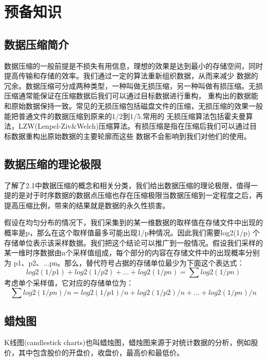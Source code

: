 
\chapter{预备知识}
\label{Chapter 2}

\section{数据压缩简介}
\label{Section 2.1}


数据压缩的一般前提是不损失有用信息，理想的效果是达到最小的存储空间，同时提高传输和存储的效率。我们通过一定的算法重新组织数据，从而来减少
数据的冗余。数据压缩可分成两种类型，一种叫做无损压缩，另一种叫做有损压缩。无损压缩通常能保证在压缩数据后我们可以通过目标数据进行重构，
重构出的数据能和原始数据保持一致。常见的无损压缩包括磁盘文件的压缩，无损压缩的效果一般能把普通文件的数据压缩到原来的1/2到1/5.常用的
无损压缩算法包括霍夫曼算法，LZW(Lenpel-Ziv\&Welch)压缩算法。有损压缩是指在压缩后我们可以通过目标数据重构出原始数据的主要轮廓而这些
数据不会影响到我们对他们的使用。


\section{数据压缩的理论极限}
\label{Section 2.2}

了解了2.1中数据压缩的概念和相关分类，我们给出数据压缩的理论极限，值得一提的是对于时序数据的数据点压缩也存在压缩极限当数据压缩到一定程度之后，再提高压缩比例，带来的结果就是数据的永久性损害。

假设在均匀分布的情况下，我们采集到的某一维数据的取样值在存储文件中出现的概率是p，那么在这个取样值最多可能出现1/p种情况。因此我们需要log2(1/p)
个存储单位表示该采样数据。我们把这个结论可以推广到一般情况。假设我们采样的某一维时序数据由n个采样值组成，每个部分的内容在存储文件中的出现概率分别为
p1、p2、...pn。那么，替代符号占据的存储单位最少为下面这个表达式：
\begin{equation}
log2(1/p1) + log2(1/p2) + ... + log2(1/pn)= ∑ log2(1/pn)
\end{equation}
考虑单个采样值，它对应的存储单位为：
\begin{equation}
∑ log2(1/pn) / n= log2(1/p1)/n + log2(1/p2)/n + ... + log2(1/pn)/n
\end{equation}


\section{蜡烛图}
\label{Section 2.3}
K线图(candlestick charts)也叫蜡烛图，蜡烛图来源于对统计数据的分析，例如股价，其中包含股价的开盘价，收盘价，最高价和最低价。

